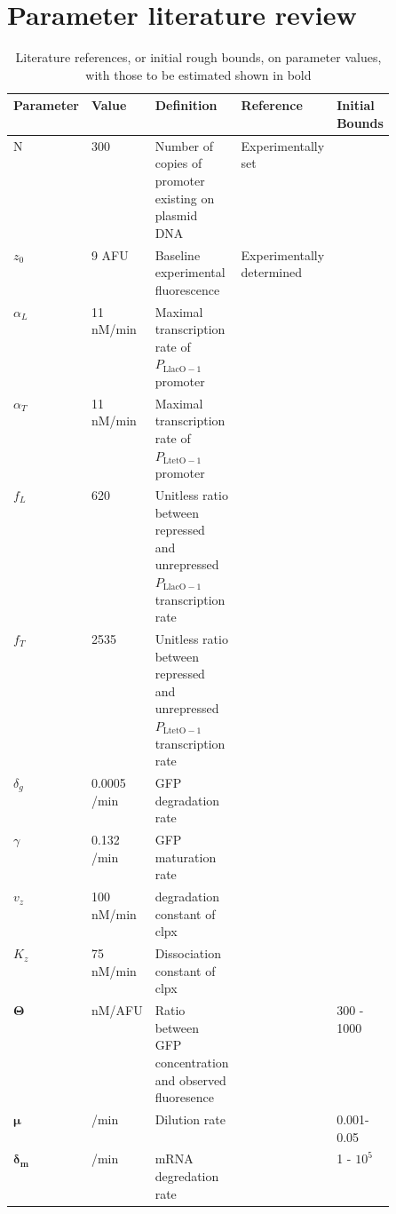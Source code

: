 \documentclass[10pt,journal]{./IEEE_latex_class/IEEEtran}
\begin{document}
\section{Parameter literature review}
\label{Parameter literature review}
\setcounter{figure}{0}    


\begin{table}[H]
\renewcommand{\arraystretch}{1.3}
\caption{Literature references, or initial rough bounds, on parameter values, with those to be estimated shown in bold}
\centering
\begin{tabular}{| l | l | p{0.3\linewidth} | p{0.1\linewidth} | p{0.1\linewidth} |}
\hline \textbf{Parameter} &  \textbf{Value} & \textbf{Definition} & \textbf{Reference} & \textbf{Initial Bounds}  \\
\hline \hline N & 300 & Number of copies of promoter existing on plasmid DNA & Experimentally set & \\
\hline $z_{0}$ &   9 AFU & Baseline experimental fluorescence & Experimentally determined &  \\
\hline $\alpha_{L}$ & 11 nM/min & Maximal transcription rate of $P_\mathrm{LlacO-1}$ promoter & \cite{Lutz1997} &\\
\hline $\alpha_{T}$  & 11 nM/min  & Maximal transcription rate of $P_{\mathrm{LtetO-1}}$ promoter  & \cite{Lutz1997}& \\
\hline $f_{L}$ & 620 & Unitless ratio between repressed and unrepressed $P_\mathrm{LlacO-1}$ transcription rate  & \cite{Lutz1997}  &  \\ 
\hline $f_{T}$ & 2535 & Unitless ratio between repressed and unrepressed $P_{\mathrm{LtetO-1}}$ transcription rate   & \cite{Lutz1997} &\\
\hline $\delta_{g}$  & 0.0005 /min  & GFP degradation rate & \cite{Andersen1998} &\\
\hline $\gamma$ &  0.132 /min & GFP maturation rate & \cite{Iizuka2011} & \\
\hline $v_{z}$ & 100 nM/min & degradation constant of clpx & \cite{Hersch2004} &\\
\hline $K_{z}$   &   75 nM/min & Dissociation constant of clpx & \cite{Hersch2004} &\\
\hline $\boldsymbol{\Theta}$  &   nM/AFU & Ratio between GFP concentration and observed fluoresence & & 300 - 1000  \\
\hline $\boldsymbol{\mu}$ &  /min & Dilution rate & & 0.001-0.05\\
\hline $\boldsymbol{\delta_{m}}$ &  /min & mRNA degredation rate & & 1 - $10^5$ \\

\end{tabular}
\end{table}
\end{document}
